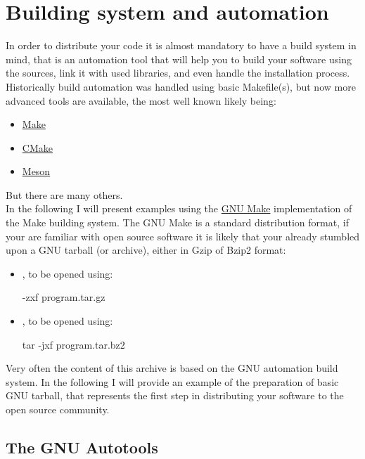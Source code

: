 \chapter{Building system and automation}

In order to distribute your code it is almost mandatory to have a build system in mind, that is an automation tool that will help you to build your software using the sources, link it with used libraries, and even handle the installation process. \\
Historically build automation was handled using basic Makefile(s), but now more advanced tools are available, the most well known likely being:
\begin{itemize}
\item \href{https://en.wikipedia.org/wiki/Make\_(software)}{Make} 
\item \href{https://en.wikipedia.org/wiki/CMake}{CMake}
\item \href{https://en.wikipedia.org/wiki/Meson\_(software)}{Meson}
\end{itemize}
But there are many others. \\
In the following I will present examples using the \href{https://www.gnu.org/software/make/}{GNU Make} implementation of the Make building system. 
The GNU Make is a standard distribution format, if your are familiar with open source software it is likely that your already stumbled upon a GNU tarball (or archive), 
either in Gzip of Bzip2 format:
\begin{itemize}
\item {}, to be opened using: \begin{script}\fprompt{~} -zxf program.tar.gz\end{script}
\item {}, to be opened using: \begin{script}\fprompt{~} tar -jxf program.tar.bz2\end{script}
\end{itemize}
Very often the content of this archive is based on the GNU automation build system. 
In the following I will provide an example of the preparation of basic GNU tarball, that represents the first step in distributing your software to the open source community.
\newpage

\section{The GNU Autotools}

